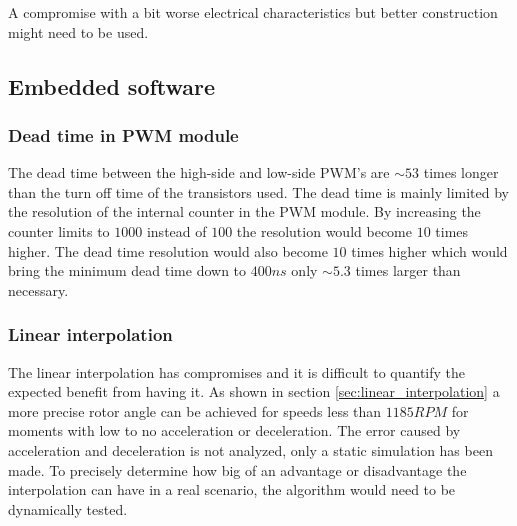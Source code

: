 A compromise with a bit worse electrical characteristics but better construction might need to be used.

\subsection{Embedded software}

\subsubsection{Dead time in PWM module}

The dead time between the high-side and low-side PWM's are $\sim 53$ times longer than the turn off time of the transistors used. The dead time is mainly limited by the resolution of the internal counter in the PWM module. By increasing the counter limits to $1000$ instead of $100$ the resolution would become $10$ times higher. The dead time resolution would also become $10$ times higher which would bring the minimum dead time down to $400ns$ only $\sim 5.3$ times larger than necessary.


\subsubsection{Linear interpolation}
The linear interpolation has compromises and it is difficult to quantify the expected benefit from having it. As shown in section \ref{sec:linear_interpolation} a more precise rotor angle can be achieved for speeds less than $1185RPM$ for moments with low to no acceleration or deceleration. The error caused by acceleration and deceleration is not analyzed, only a static simulation has been made. To precisely determine how big of an advantage or disadvantage the interpolation can have in a real scenario, the algorithm would need to be dynamically tested.




 
 